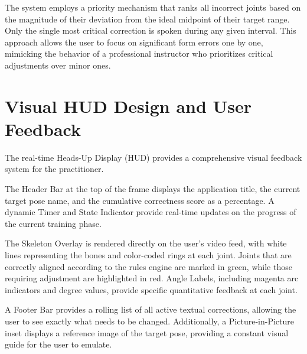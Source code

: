 The system employs a priority mechanism that ranks all incorrect joints based on the magnitude of their deviation from the ideal midpoint of their target range. Only the single most critical correction is spoken during any given interval. This approach allows the user to focus on significant form errors one by one, mimicking the behavior of a professional instructor who prioritizes critical adjustments over minor ones.

\section{Visual HUD Design and User Feedback}
The real-time Heads-Up Display (HUD) provides a comprehensive visual feedback system for the practitioner.

The Header Bar at the top of the frame displays the application title, the current target pose name, and the cumulative correctness score as a percentage. A dynamic Timer and State Indicator provide real-time updates on the progress of the current training phase.

The Skeleton Overlay is rendered directly on the user's video feed, with white lines representing the bones and color-coded rings at each joint. Joints that are correctly aligned according to the rules engine are marked in green, while those requiring adjustment are highlighted in red. Angle Labels, including magenta arc indicators and degree values, provide specific quantitative feedback at each joint.

A Footer Bar provides a rolling list of all active textual corrections, allowing the user to see exactly what needs to be changed. Additionally, a Picture-in-Picture inset displays a reference image of the target pose, providing a constant visual guide for the user to emulate.
